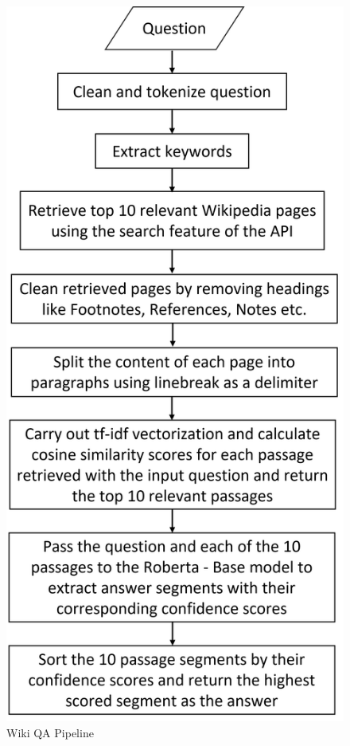 \documentclass[12pt, a4paper]{article}
\begin{document}
\clearpage 
\begin{figure}[h]
    \includegraphics[scale=0.6]{wikiqa flowchart.png} 
    \centering 
    \caption{Wiki QA Pipeline}
    \centering 
\end{figure} 
\end{document}
